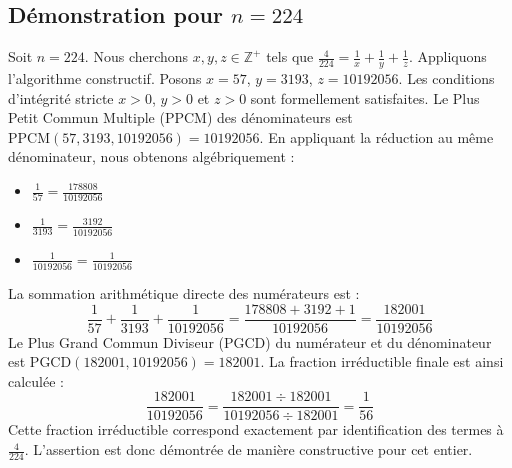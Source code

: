 \documentclass[11pt,a4paper]{article}
\begin{document}
\subsection{Démonstration pour $n = 224$}
Soit $n = 224$. Nous cherchons $x, y, z \in \mathbb{Z}^{+}$ tels que $\frac{4}{224} = \frac{1}{x} + \frac{1}{y} + \frac{1}{z}$.
Appliquons l'algorithme constructif. Posons $x = 57$, $y = 3193$, $z = 10192056$.
Les conditions d'intégrité stricte $x > 0$, $y > 0$ et $z > 0$ sont formellement satisfaites.
Le Plus Petit Commun Multiple (PPCM) des dénominateurs est $\text{PPCM}(57, 3193, 10192056) = 10192056$.
En appliquant la réduction au même dénominateur, nous obtenons algébriquement :
\begin{itemize}
    \item $\frac{1}{57} = \frac{178808}{10192056}$
    \item $\frac{1}{3193} = \frac{3192}{10192056}$
    \item $\frac{1}{10192056} = \frac{1}{10192056}$
\end{itemize}
La sommation arithmétique directe des numérateurs est :
$$ \frac{1}{57} + \frac{1}{3193} + \frac{1}{10192056} = \frac{178808 + 3192 + 1}{10192056} = \frac{182001}{10192056} $$
Le Plus Grand Commun Diviseur (PGCD) du numérateur et du dénominateur est $\text{PGCD}(182001, 10192056) = 182001$.
La fraction irréductible finale est ainsi calculée :
$$ \frac{182001}{10192056} = \frac{182001 \div 182001}{10192056 \div 182001} = \frac{1}{56} $$
Cette fraction irréductible correspond exactement par identification des termes à $\frac{4}{224}$. L'assertion est donc démontrée de manière constructive pour cet entier.
\end{document}
